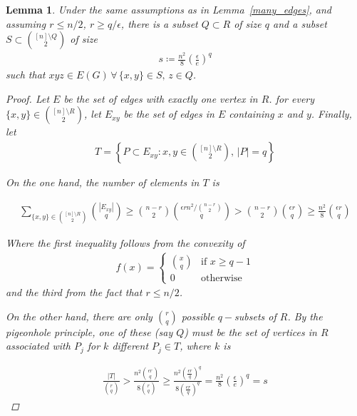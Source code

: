 \documentclass[12pt]{article}
\newtheorem{lemma}[thm]{Lemma}
\begin{document}
    \begin{lemma}\label{s}
        Under the same assumptions as in Lemma~\ref{many_edges},
        and assuming $r \leq n/2$, $r \geq q / \epsilon$,
        there is a subset $Q \subset R$
        of size $q$  and a subset $S \subset \binom{[n] \setminus Q}{2}$ of size
        \begin{align*}
            s \coloneqq \frac{n^2}{8} \left(\frac{\epsilon}{e}\right)^q %
        \end{align*}
        such that $xyz \in E(G) \, \forall \, \{x, y\} \in S, \, z \in Q$.

        \begin{proof}
            Let $E$ be the set of edges with exactly one vertex in $R$.
            for every $\{x, y\} \in \binom{[n] \setminus R}{2}$, let $E_{xy}$ be the set of
            edges in $E$ containing $x$ and $y$.
            Finally, let
            \begin{align*}
                T = \left\{P \subset E_{xy} : x, y \in \binom{[n] \setminus R}{2} , \, |P| = q\right\}
            \end{align*}

            On the one hand, the number of elements in $T$ is

            \begin{align*}
                \sum_{\{x, y\} \in \binom{[n] \setminus R}{2}} \binom{|E_{xy}|}{q}
                \geq
                \binom{n - r}{2} \binom{\epsilon r n^2 / \binom{n-r}{2}}{q}
                >
                \binom{n - r}{2} \binom{\epsilon r}{q}
                \geq
                \frac{n^2}{8} \binom{\epsilon r}{q}
            \end{align*}

            Where the first inequality follows from the convexity of
            \begin{align*}
            	f(x) =
            	\begin{cases}
            		\binom{x}{q} & \text{if } x \geq q - 1 \\
            		0 & \text{otherwise}
            	\end{cases}
            \end{align*}
            and the third
            from the fact that $r \leq n/2$.

            On the other hand, there are only $\binom{r}{q}$ possible $q-$subsets of $R$.
            By the pigeonhole principle, one of these (say $Q$) must be the set of
            vertices in $R$ associated with $P_j$ for $k$ different $P_j \in T$, where $k$ is

            \begin{align*}
                \frac{|T|}{\binom{r}{q}} > \frac{n^2 \binom{\epsilon r}{q}}{8 \binom{r}{q}} \geq
                \frac{n^2\left( \frac{\epsilon r}{q}\right)^q}{8\left(\frac{e r}{q}\right)^q} =
                \frac{n^2}{8} \left(\frac{\epsilon}{e}\right)^q = s
            \end{align*}

        \end{proof}
    \end{lemma}
\end{document}
